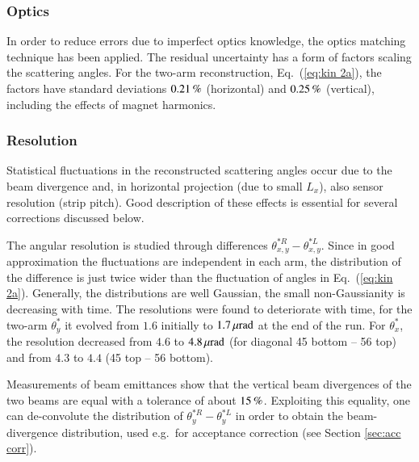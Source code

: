 
\subsubsection{Optics}
\label{sec:optics}

In order to reduce errors due to imperfect optics knowledge, the optics matching technique \cite{totem-optics} has been applied. The residual uncertainty has a form of factors scaling the scattering angles. %
For the two-arm reconstruction, Eq.~(\ref{eq:kin 2a}), the factors have standard deviations $0.21\,{\rm \%}$ (horizontal) and $0.25\,{\rm \%}$ (vertical), including the effects of magnet harmonics.



\subsubsection{Resolution}
\label{sec:resolution}

Statistical fluctuations in the reconstructed scattering angles occur due to the beam divergence and, in horizontal projection (due to small $L_x$), also sensor resolution (strip pitch). Good description of these effects is essential for several corrections discussed below.

The angular resolution is studied through differences $\theta_{x,y}^{*R} - \theta_{x,y}^{*L}$. Since in good approximation the fluctuations are independent in each arm, the distribution of the difference is just twice wider than the fluctuation of angles in Eq.~(\ref{eq:kin 2a}). Generally, the distributions are well Gaussian, the small non-Gaussianity is decreasing with time. The resolutions were found to deteriorate with time, for the two-arm $\theta_y^*$ it evolved from $1.6$ initially to $1.7\,{\rm \mu rad}$ at the end of the run. For $\theta_x^*$, the resolution decreased from $4.6$ to $4.8\,{\rm \mu rad}$ (for diagonal 45 bottom -- 56 top) and from $4.3$ to $4.4$ (45 top -- 56 bottom).

Measurements of beam emittances show that the vertical beam divergences of the two beams are equal with a tolerance of about $15\,{\rm \%}$. Exploiting this equality, one can de-convolute the distribution of $\theta_y^{*R} - \theta_y^{*L}$ in order to obtain the beam-divergence distribution, used e.g.~for acceptance correction (see Section \ref{sec:acc corr}).


